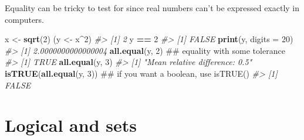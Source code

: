 \documentclass[]{book}
\newenvironment{Shaded}{\begin{snugshade}}{\end{snugshade}}
\newcommand{\KeywordTok}[1]{\textcolor[rgb]{0.13,0.29,0.53}{\textbf{#1}}}
\newcommand{\DataTypeTok}[1]{\textcolor[rgb]{0.13,0.29,0.53}{#1}}
\newcommand{\DecValTok}[1]{\textcolor[rgb]{0.00,0.00,0.81}{#1}}
\newcommand{\StringTok}[1]{\textcolor[rgb]{0.31,0.60,0.02}{#1}}
\newcommand{\CommentTok}[1]{\textcolor[rgb]{0.56,0.35,0.01}{\textit{#1}}}
\newcommand{\OtherTok}[1]{\textcolor[rgb]{0.56,0.35,0.01}{#1}}
\newcommand{\OperatorTok}[1]{\textcolor[rgb]{0.81,0.36,0.00}{\textbf{#1}}}
\newcommand{\NormalTok}[1]{#1}
\theoremstyle{definition}
\theoremstyle{definition}
\theoremstyle{definition}
\theoremstyle{remark}
\begin{document}
Equality can be tricky to test for since real numbers can't be expressed
exactly in computers.

\begin{Shaded}
\begin{Highlighting}[]
\NormalTok{x <-}\StringTok{ }\KeywordTok{sqrt}\NormalTok{(}\DecValTok{2}\NormalTok{)}
\NormalTok{(y <-}\StringTok{ }\NormalTok{x}\OperatorTok{^}\DecValTok{2}\NormalTok{)}
\CommentTok{#> [1] 2}
\NormalTok{y }\OperatorTok{==}\StringTok{ }\DecValTok{2}
\CommentTok{#> [1] FALSE}
\KeywordTok{print}\NormalTok{(y, }\DataTypeTok{digits =} \DecValTok{20}\NormalTok{)}
\CommentTok{#> [1] 2.0000000000000004}
\KeywordTok{all.equal}\NormalTok{(y, }\DecValTok{2}\NormalTok{)          ## equality with some tolerance}
\CommentTok{#> [1] TRUE}
\KeywordTok{all.equal}\NormalTok{(y, }\DecValTok{3}\NormalTok{)}
\CommentTok{#> [1] "Mean relative difference: 0.5"}
\KeywordTok{isTRUE}\NormalTok{(}\KeywordTok{all.equal}\NormalTok{(y, }\DecValTok{3}\NormalTok{))  ## if you want a boolean, use isTRUE()}
\CommentTok{#> [1] FALSE}
\end{Highlighting}
\end{Shaded}

\section{Logical and sets}\label{logical-and-sets}

\begin{Shaded}
\end{Shaded}
\end{document}
